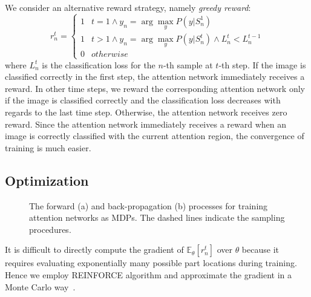 \documentclass[10pt,twocolumn,letterpaper]{article}
\begin{document}
We consider an alternative reward strategy, namely {\em greedy reward}:
\begin{equation}
r^t_n=\left\{
\begin{array}{cc}
1 & t = 1 \wedge y_n = \arg\max_y P(y | S^1_n) \\
1 & t > 1 \wedge y_{n} = \arg\max_y P(y | S^t_n) \wedge L^t_n < L^{t-1}_n \\
0 & otherwise \end{array}
\right.
\end{equation}
where $L^t_n$ is the classification loss for the $n$-th sample at $t$-th step.
If the image is classified correctly in the first step, the attention network immediately receives a reward.
In other time steps, we reward the corresponding attention network only if the image is classified correctly and the classification loss decreases with regards to the last time step.
Otherwise, the attention network receives zero reward.
Since the attention network immediately receives a reward when an image is correctly classified with the current attention region, the convergence of training is much easier.

\subsection{Optimization}

\begin{figure}[t]
\begin{center}
\hspace{0.05in}
\end{center}
\caption{The forward (a) and back-propagation (b) processes for training attention networks as MDPs.
The dashed lines indicate the sampling procedures.
}
\label{fig:optimization}
\end{figure}

It is difficult to directly compute the gradient of $\mathbb{E}_{\theta}[r^t_n]$ over $\theta$ because it requires evaluating exponentially many possible part locations during training.
Hence we employ REINFORCE algorithm and approximate the gradient in a Monte Carlo way~\cite{sutton1999policy}.
\end{document}
